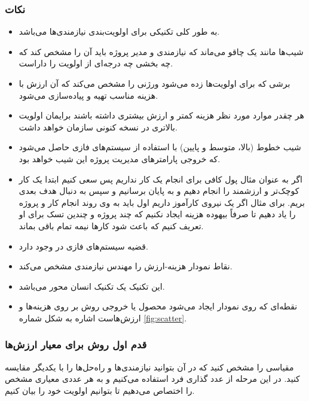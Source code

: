 \subsubsection*{نکات}

\begin{itemize}
    \item به طور کلی  تکنیکی برای اولویت‌بندی نیازمندی‌ها می‌باشد.
    \item شیب‌ها مانند یک چاقو می‌ماند که نیازمندی و مدیر پروژه باید آن را مشخص
    کند که چه بخشی چه درجه‌ای از اولویت را داراست.
    \item برشی که برای اولویت‌ها زده می‌شود ورژنی را مشخص می‌کند که آن ارزش با
    هزینه مناسب تهیه و پیاده‌سازی می‌شود.
    \item هر چقدر موارد مورد نظر هزینه کمتر و ارزش بیشتری داشته باشند برایمان
    اولویت بالاتری در نسخه کنونی سازمان خواهد داشت.
    \item شیب خطوط (بالا، متوسط و پایین) با استفاده از سیستم‌های فازی حاصل
    می‌شود که خروجی پارامتر‌های مدیریت پروژه این شیب خواهد بود.
    \item اگر به عنوان مثال پول کافی برای انجام یک کار نداریم پس سعی کنیم ابتدا
    یک کار کوچک‌تر و ارزشمند را انجام دهیم و به پایان برسانیم و سپس به دنبال هدف
    بعدی بریم. برای مثال اگر یک نیروی کارآموز داریم اول باید به وی روند انجام
    کار و پروژه را یاد دهیم تا صرفاً بیهوده هزینه ایجاد نکنیم که چند پروژه و
    چندین تسک برای او تعریف کنیم که باعث شود کار‌ها نیمه تمام باقی بماند.
    \item قضیه سیستم‌های فازی در  وجود دارد.
    \item نقاط نمودار هزینه-ارزش را مهندس نیازمندی مشخص می‌کند.
    \item این تکنیک یک تکنیک انسان محور می‌باشد.
    \item نقطه‌ای که روی نمودار ایجاد می‌شود محصول یا خروجی روش  بر روی
    هزینه‌ها و ارزش‌هاست اشاره به شکل شماره \ref{fig:scatter}.
\end{itemize}

\subsubsection{قدم اول روش  برای معیار ارزش‌ها}

مقیاسی را مشخص کنید که در آن بتوانید نیازمندی‌ها و راه‌حل‌ها را با یکدیگر مقایسه
کنید. در این مرحله از عدد گذاری فرد استفاده می‌کنیم و به هر عددی معیاری مشخص را
اختصاص می‌دهیم تا بتوانیم اولویت خود را بیان کنیم.


